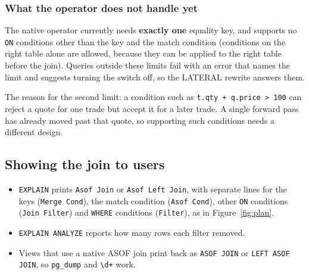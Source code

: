 \documentclass[11pt,a4paper]{article}
\newcommand{\code}[1]{\texttt{#1}}
\begin{document}
\subsubsection{What the operator does not handle yet}

The native operator currently needs \textbf{exactly one} equality key, and supports no
\code{ON} conditions other than the key and the match condition (conditions on the right
table alone are allowed, because they can be applied to the right table before the join).
Queries outside these limits fail with an error that names the limit and suggests turning
the switch off, so the LATERAL rewrite answers them.

The reason for the second limit: a condition such as \code{t.qty + q.price > 100} can
reject a quote for one trade but accept it for a later trade. A single forward pass has
already moved past that quote, so supporting such conditions needs a different design.

\subsection{Showing the join to users}

\begin{itemize}
  \item \code{EXPLAIN} prints \code{Asof Join} or \code{Asof Left Join}, with separate
        lines for the keys (\code{Merge Cond}), the match condition (\code{Asof Cond}),
        other \code{ON} conditions (\code{Join Filter}) and \code{WHERE} conditions
        (\code{Filter}), as in Figure~\ref{fig:plan}.
  \item \code{EXPLAIN ANALYZE} reports how many rows each filter removed.
  \item Views that use a native ASOF join print back as \code{ASOF JOIN} or
        \code{LEFT ASOF JOIN}, so \code{pg\_dump} and \code{\textbackslash d+} work.
\end{itemize}

\end{document}
